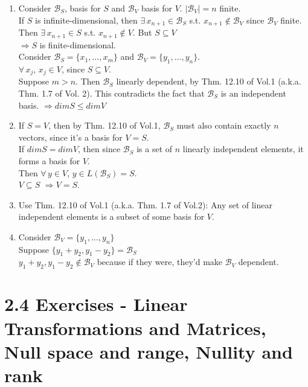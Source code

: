\documentclass[twoside]{amsart}
\theoremstyle{plain}
\theoremstyle{definition}
\newcommand{\exercisehead}[1]
  {
   \noindent{\small\bf Exercise #1.}
   \smallskip}
\begin{document}
\exercisehead{24}
\begin{enumerate}
\item Consider $\mathcal{B}_S$, basis for $S$ and $\mathcal{B}_V$ basis for $V$.  $|\mathcal{B}_V| = n$ finite.  \\
  If $S$ is infinite-dimensional, then $\exists \, x_{n+1} \in \mathcal{B}_S$ s.t. $x_{n+1} \notin \mathcal{B}_V$ since $\mathcal{B}_V$ finite.  Then $\exists \, x_{n+1} \in S$ s.t. $x_{n+1} \notin V$.  But $S \subseteq V$ \\
  $\Longrightarrow S$ is finite-dimensional.  \\

Consider $\mathcal{B}_S = \{ x_1,\dots, x_m \}$ and $\mathcal{B}_V = \{ y_1,\dots, y_n \}$.  \\
\quad $\forall \, x_j$, $x_j \in V$, since $S \subseteq V$.  \smallskip \\
Suppose $m > n$.  Then $\mathcal{B}_S$ linearly dependent, by Thm. 12.10 of Vol.1 (a.k.a. Thm. 1.7 of Vol. 2).  This contradicts the fact that $\mathcal{B}_S$ is an independent basis.  $\Longrightarrow dim{S} \leq dim{V}$
\item If $S=V$, then by Thm. 12.10 of Vol.1, $\mathcal{B}_S$ must also contain exactly $n$ vectors, since it's a basis for $V=S$.  \\

If $dim{S} = dim{V}$, then since $\mathcal{B}_S$ is a set of $n$ linearly independent elements, it forms a basis for $V$. \\  Then $\forall\, y \in V$, $y \in L(\mathcal{B}_S)=S$.  \\
\quad $V \subseteq S$  $\Longrightarrow V = S$.  
\item Use Thm. 12.10 of Vol.1 (a.k.a. Thm. 1.7 of Vol.2): Any set of linear independent elements is a subset of some basis for $V$.  
\item Consider $\mathcal{B}_V = \{ y_1, \dots, y_n \}$ \\
  Suppose $\{ y_1 + y_2, y_1 - y_2 \} = \mathcal{B}_S$ \medskip \\
  $y_1 + y_2, y_1 - y_2 \notin \mathcal{B}_V$ because if they were, they'd make $\mathcal{B}_V$ dependent.  
\end{enumerate}

\section*{ 2.4 Exercises - Linear Transformations and Matrices, Null space and range, Nullity and rank }
\end{document}
